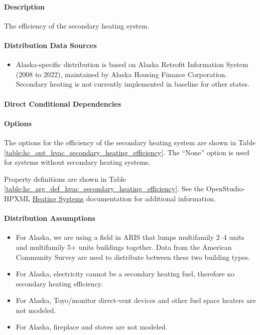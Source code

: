 \paragraph{Description}
% 
The efficiency of the secondary heating system.

\paragraph{Distribution Data Sources}
% 
\begin{itemize}
\item Alaska-specific distribution is based on Alaska Retrofit Information System (2008 to 2022), maintained by Alaska Housing Finance Corporation. Secondary heating is not currently implemented in baseline for other states.
\end{itemize}

\paragraph{Direct Conditional Dependencies}


\paragraph{Options}
The options for the efficiency of the secondary heating system are shown in Table \ref{table:hc_opt_hvac_secondary_heating_efficiency}. The ``None'' option is used for systems without secondary heating systems.



Property definitions are shown in Table \ref{table:hc_arg_def_hvac_secondary_heating_efficiency}. See the OpenStudio-HPXML \href{https://openstudio-hpxml.readthedocs.io/en/v1.10.0/workflow_inputs.html#hpxml-heating-systems}{Heating Systems} documentation for additional information.



\paragraph{Distribution Assumptions}
% 
\begin{itemize}
    \item For Alaska, we are using a field in ARIS that lumps multifamily 2--4 units and multifamily 5+ units buildings together. Data from the American Community Survey are used to distribute between these two building types.
    \item For Alaska, electricity cannot be a secondary heating fuel, therefore no secondary heating efficiency.
    \item For Alaska, Toyo/monitor direct-vent devices and other fuel space heaters are not modeled.
    \item For Alaska, fireplace and stoves are not modeled.
\end{itemize}
